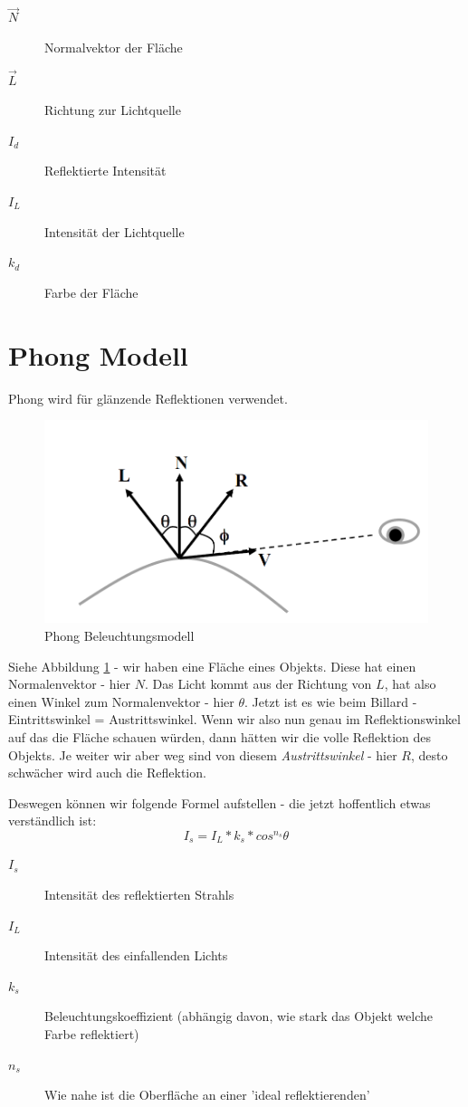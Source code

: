 \begin{description}
	\item[\(\vec{N}\)] Normalvektor der Fläche
	\item[\(\vec{L}\)] Richtung zur Lichtquelle
	\item[\(I_d\)] Reflektierte Intensität
	\item[\(I_L\)] Intensität der Lichtquelle
	\item[\(k_d\)] Farbe der Fläche
\end{description}

\section{Phong Modell}
Phong wird für glänzende Reflektionen verwendet. 
\begin{figure}[!ht]
	\centering
	\includegraphics[width=0.4\linewidth]{fig/phong}
	\caption{Phong Beleuchtungsmodell}
	\label{fig:phong}
\end{figure}
Siehe Abbildung \ref{fig:phong} - wir haben eine Fläche eines Objekts. Diese hat einen Normalenvektor - hier \(N\). Das Licht kommt aus der Richtung von \(L\), hat also einen Winkel zum Normalenvektor - hier \(\theta\). Jetzt ist es wie beim Billard - Eintrittswinkel = Austrittswinkel. Wenn wir also nun genau im Reflektionswinkel auf das die Fläche schauen würden, dann hätten wir die volle Reflektion des Objekts. Je weiter wir aber weg sind von diesem \textit{Austrittswinkel} - hier \(R\), desto schwächer wird auch die Reflektion. 

Deswegen können wir folgende Formel aufstellen - die jetzt hoffentlich etwas verständlich ist:
\begin{displaymath}
I_s = I_L*k_s*cos^{n_s}\theta
\end{displaymath}

\begin{description}
	\item[\(I_s\)] Intensität des reflektierten Strahls
	\item[\(I_L\)] Intensität des einfallenden Lichts
	\item[\(k_s\)] Beleuchtungskoeffizient (abhängig davon, wie stark das Objekt welche Farbe reflektiert)
	\item[\(n_s\)] Wie nahe ist die Oberfläche an einer 'ideal reflektierenden'
\end{description}

